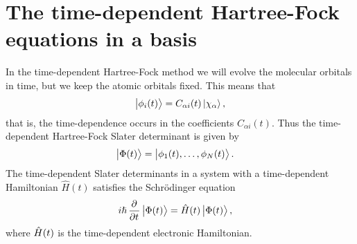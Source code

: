 \section{The time-dependent Hartree-Fock equations in a basis}
    In the time-dependent Hartree-Fock method we will evolve the molecular
    orbitals in time, but we keep the atomic orbitals fixed.
    This means that
    \begin{align}
        \ket{\phi_i(t)} = C_{\alpha i}(t)\ket{\chi_{\alpha}},
    \end{align}
    that is, the time-dependence occurs in the coefficients $C_{\alpha i}(t)$.
    Thus the time-dependent Hartree-Fock Slater determinant is given by
    \begin{align}
        \ket{\Phi(t)}
        &=
        \ket{
            \phi_1(t), \dots, \phi_N(t)
        }.
    \end{align}
    The time-dependent Slater determinants in a system with a time-dependent
    Hamiltonian $\hat{H}(t)$ satisfies the Schrödinger equation
    \begin{align}
        i\hslash\dpd[]{}{t}\ket{\Phi(t)}
        &= \hamil(t)\ket{\Phi(t)},
    \end{align}
    where $\hat{H}(t)$ is the time-dependent electronic Hamiltonian.

